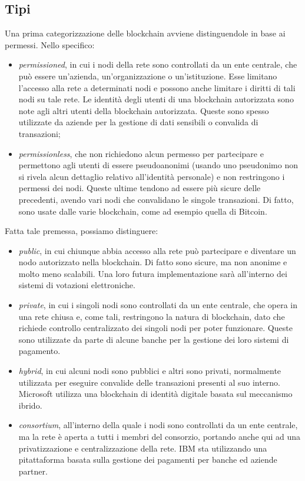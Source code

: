 \subsection{Tipi}\label{sec:tecnologie-blockchain-tipi}
Una prima categorizzazione delle blockchain avviene distinguendole in base ai permessi. Nello specifico:
\begin{itemize}
    \item \textit{permissioned}, in cui i nodi della rete sono controllati da un ente centrale, che può essere un'azienda, un'organizzazione o un'istituzione.
    Esse limitano l'accesso alla rete a determinati nodi e possono anche limitare i diritti di tali nodi su tale rete. Le identità degli utenti di una blockchain autorizzata sono note agli altri utenti della blockchain autorizzata.
    Queste sono spesso utilizzate da aziende per la gestione di dati sensibili o convalida di transazioni;
    \item \textit{permissionless}, che non richiedono alcun permesso per partecipare e permettono agli utenti di essere pseudoanonimi 
    (usando uno pseudonimo non si rivela alcun dettaglio relativo all'identità personale) e non restringono i permessi dei nodi. Queste ultime tendono ad essere più sicure delle precedenti, avendo vari nodi che convalidano le singole transazioni.
    Di fatto, sono usate dalle varie blockchain, come ad esempio quella di Bitcoin.
\end{itemize}

Fatta tale premessa, possiamo distinguere:
\begin{itemize}
    \item \textit{public}, in cui chiunque abbia accesso alla rete può partecipare e diventare un nodo autorizzato nella blockchain. Di fatto sono sicure, ma non anonime e molto meno scalabili.
    Una loro futura implementazione sarà all'interno dei sistemi di votazioni elettroniche.
    \item \textit{private}, in cui i singoli nodi sono controllati da un ente centrale, che opera in una rete chiusa e, come tali, restringono la natura di blockchain, dato che richiede controllo centralizzato dei singoli nodi per poter funzionare.
    Queste sono utilizzate da parte di alcune banche per la gestione dei loro sistemi di pagamento.
    \item \textit{hybrid}, in cui alcuni nodi sono pubblici e altri sono privati, normalmente utilizzata per eseguire convalide delle transazioni presenti al suo interno.
    Microsoft utilizza una blockchain di identità digitale basata sul meccanismo ibrido.
    \item \textit{consortium}, all'interno della quale i nodi sono controllati da un ente centrale, ma la rete è aperta a tutti i membri del consorzio, portando anche qui ad una privatizzazione e centralizzazione della rete.
    IBM sta utilizzando una pitattaforma basata sulla gestione dei pagamenti per banche ed aziende partner.
\end{itemize}

